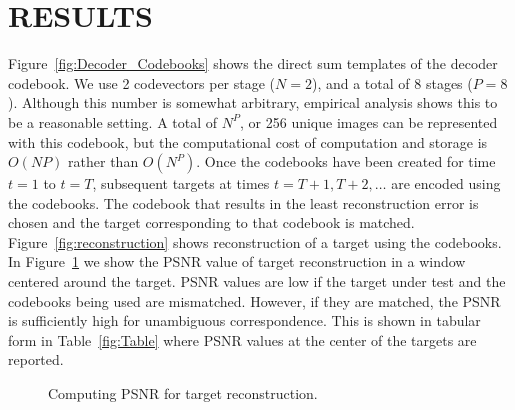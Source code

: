 \documentclass{article}
\begin{document}
\section{RESULTS}
Figure~\ref{fig:Decoder_Codebooks} shows the direct sum templates of the decoder codebook.  We use 2 codevectors per stage ($N=2$), and a total of 8 stages ($P=8$).  Although this number is somewhat arbitrary, empirical analysis shows this to be a reasonable setting.  A total of $N^P$, or 256 unique images can be represented with this codebook, but the computational cost of computation and storage is $O(NP)$ rather than $O(N^P)$.  Once the codebooks have been created for time $t=1$ to $t=T$, subsequent targets at times $t=T+1, T+2, \ldots$ are encoded using the codebooks.  The codebook that results in the least reconstruction error is chosen and the target corresponding to that codebook is matched.  Figure~\ref{fig:reconstruction} shows reconstruction of a target using the codebooks.  In Figure~\ref{fig:PSNR_3D} we show the PSNR value of target reconstruction in a window centered around the target.  PSNR values are low if the target under test and the codebooks being used are mismatched.  However, if they are matched, the PSNR is sufficiently high for unambiguous correspondence.  This is shown in tabular form in Table~\ref{fig:Table} where PSNR values at the center of the targets are reported. 


\begin{figure}
			\centering
		\caption{Computing PSNR for target reconstruction.} 					
		\label{fig:PSNR_3D}	
\end{figure}
\end{document}
